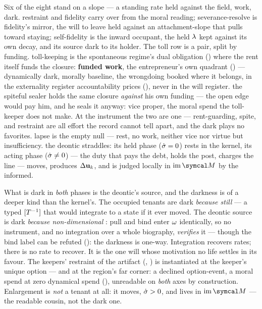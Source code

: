 \documentclass[../main]{subfiles}
\begin{document}
Six of the eight stand on a slope --- a standing rate held against the field, work,
dark.  restraint and  fidelity carry over from the moral
reading;  severance-resolve is fidelity's mirror, the will to leave held
against an attachment-slope that pulls toward staying;  self-fidelity is
the inward occupant, the held $\lambda$ kept against its own decay, and its source
dark to its holder. The toll row is a pair, split by funding. 
toll-keeping is the spontaneous regime's dual obligation () where the rent
itself funds the closure: \textbf{funded work}, the entrepreneur's own quadrant
() --- dynamically dark, morally baseline, the wrongdoing booked
where it belongs, in the externality register accountability prices (),
never in the will register.  the spiteful sealer holds the same closure
\emph{against} his own funding --- the open edge would pay him, and he seals it anyway:
vice proper, the moral spend the toll-keeper does not make. At the instrument the two
are one --- rent-guarding, spite, and restraint are all effort the record cannot tell
apart, and the dark plays no favorites.  lapse is the empty null ---
rest, no work, neither vice nor virtue but
insufficiency.  the deontic straddles: its held phase ($\dot{\sigma}=0$) rests in
the kernel, its acting phase ($\dot{\sigma}\neq0$) --- the duty that pays the debt, holds the
post, charges the line --- moves, produces $\Delta\mathbf{u}\sb{k}$, and is judged locally in
$\mathrm{im}\,\readout$ by the informed.

What is dark in \emph{both} phases is the deontic's source, and the darkness is of a deeper
kind than the kernel's. The occupied tenants are dark \emph{because still} --- a typed
$[T\sp{-1}]$ that would integrate to a state if it ever moved. The deontic source is dark
\emph{because non-dimensional} : pull and bind enter $\omega$ identically, so no
instrument, and no integration over a whole biography, \emph{verifies} it --- though the
bind label can be refuted (): the darkness is one-way. Integration recovers
rates; there is no rate to recover. It is the one will whose motivation no life settles
in its favour. The
keepers' restraint of the artifact (, ) is 
instantiated at the keeper's unique option --- and at the region's far corner: a
declined option-event, a moral spend at zero dynamical spend
(), unreadable on \emph{both} axes by construction. Enlargement is \emph{not} a tenant at all: it
moves, $\dot{\sigma}>0$, and lives in $\mathrm{im}\,\readout$ --- the readable cousin, not the
dark one.
\end{document}
